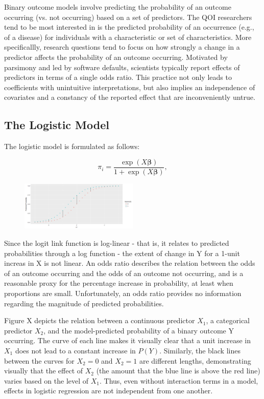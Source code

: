 \documentclass[jou, apacite]{apa6}
\begin{document}
Binary outcome models involve predicting the probability of an outcome occurring (vs. not occurring) based on a set of predictors. 
The QOI researchers tend to be most interested in is the predicted probability of an occurrence (e.g., of a disease) for individuals with a characteristic or set of characteristics.
More specificallly, research questions tend to focus on how strongly a change in a predictor affects the probability of an outcome occurring.
Motivated by parsimony and led by software defaults, scientists typically report effects of predictors in terms of a single odds ratio.
This practice not only leads to coefficients with unintuitive interpretations, but also implies an independence of covariates and a constancy of the reported effect that are inconveniently untrue.

\subsection{The Logistic Model}

The logistic model is formulated as follows:

\begin{equation} \label{log1}
\pi_i = \dfrac{\exp (X \bm{\beta})}{1 + \exp (X \bm{\beta})},
\end{equation}

\begin{figure}[h]
\includegraphics[width=0.5\textwidth]{LogisticFirstDiff.png}
\end{figure}

Since the logit link function is log-linear - that is, it relates to predicted probabilities through a log function - the extent of change in Y for a 1-unit increas in X is not linear. 
An odds ratio describes the relation between the odds of an outcome occurring and the odds of an outcome not occurring, and is a reasonable proxy for the percentage increase in probability, at least when proportions are small.
Unfortunately, an odds ratio provides no information regarding the magnitude of predicted probabilities.

Figure X depicts the relation between a continuous predictor $X_1$, a categorical predictor $X_2$, and the model-predicted probability of a binary outcome Y occurring. 
The curve of each line makes it visually clear that a unit increase in $X_1$ does not lead to a constant increase in $P(Y)$.
Similarly, the black lines between the curves for $X_2=0$ and $X_2=1$ are different lengths, demonstrating visually that the effect of $X_2$ (the amount that the blue line is above the red line) varies based on the level of $X_1$.
Thus, even without interaction terms in a model, effects in logistic regression are not independent from one another. 
\end{document}

